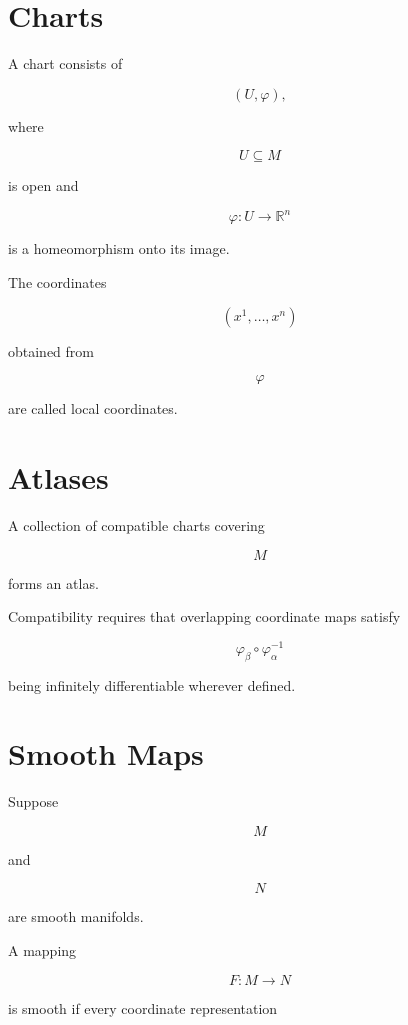 \documentclass[11pt,fleqn]{book}
\numberwithin{equation}{chapter}
\theoremstyle{plain}
\theoremstyle{definition}
\theoremstyle{remark}
\begin{document}

\section{Charts}

A chart consists of

\[
(U,\varphi),
\]

where

\[
U\subseteq M
\]

is open and

\[
\varphi:U\rightarrow\mathbb R^n
\]

is a homeomorphism onto its image.

The coordinates

\[
(x^1,\ldots,x^n)
\]

obtained from

\[
\varphi
\]

are called local coordinates.


\section{Atlases}

A collection of compatible charts covering

\[
M
\]

forms an atlas.

Compatibility requires that overlapping coordinate maps satisfy

\[
\boxed{
\varphi_\beta
\circ
\varphi_\alpha^{-1}
}
\]

being infinitely differentiable wherever defined.


\section{Smooth Maps}

Suppose

\[
M
\]

and

\[
N
\]

are smooth manifolds.

A mapping

\[
F:M\rightarrow N
\]

is smooth if every coordinate representation
\end{document}
